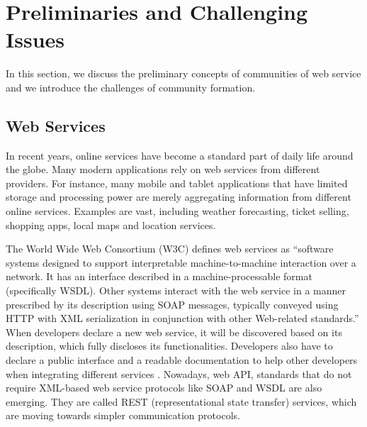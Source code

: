 \documentclass[10pt,journal,cspaper,compsoc]{IEEEtran}
\begin{document}



\section{Preliminaries and Challenging Issues}\label{s:preliminaries}
In this section, we discuss the preliminary concepts of communities of web service and we introduce the challenges of community formation.

\subsection{Web Services}\label{s:ws}

In recent years, online services have become a standard part of daily life around the globe. Many modern applications rely on web services from different providers. For instance, many mobile and tablet applications that have limited storage and processing power are merely aggregating information from different online services. Examples are vast, including weather forecasting, ticket selling, shopping apps, local maps and location services.

The World Wide Web Consortium (W3C) defines web services as ``software systems designed to support interpretable machine-to-machine interaction over a network. It has an interface described in a machine-processable format (specifically WSDL). Other systems interact with the web service in a manner prescribed by its description using SOAP messages, typically conveyed using HTTP with XML serialization in conjunction with other Web-related standards.'' When developers declare a new web service, it will be
discovered based on its description, which fully discloses its functionalities. Developers also have to declare a public interface and a readable documentation to help other developers when integrating different services \cite{w3cwsdl}. Nowadays, web API, standards that do not require XML-based web service protocols like SOAP and WSDL are also emerging. They are called REST (representational state transfer) services, which are moving towards simpler communication protocols. 
\end{document}
